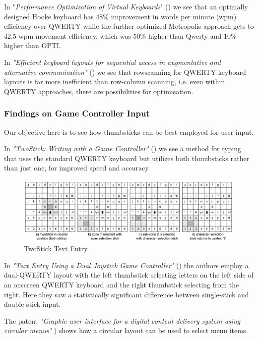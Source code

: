 \documentclass[
	letterpaper, %
]{jdf}
\begin{document}
In "\textit{Performance Optimization of Virtual Keyboards}" (\cite{zhai_hunter_smith_2002}) we see that an optimally designed Hooke keyboard has 48\% improvement in words per minute (wpm) efficiency over QWERTY while the further optimized Metropolis approach gets to 42.5 wpm movement efficiency, which was 50\% higher than Qwerty and 10\% higher than OPTI.

In \textit{"Efficient keyboard layouts for sequential access in augmentative and alternative communication"} (\cite{venkatagiri_1999}) we see that rowscanning for QWERTY keyboard layouts is far more inefficient than row-column scanning, i.e. even within QWERTY approaches, there are possibilities for optimisation.

\subsubsection{Findings on Game Controller Input}
Our objective here is to see how thumbsticks can be best employed for user input.

In \textit{"TwoStick: Writing with a Game Controller"} (\cite{twostick_2007}) we see a method for typing that uses the standard QWERTY keyboard but utilizes both thumbsticks rather than just one, for improved speed and accuracy.

\begin{figure}[h]
	\centering
	\includegraphics[width=14cm]{jdf-master/Figures/twostick.png}
	\caption{TwoStick Text Entry}
	\label{fig:twostick}
\end{figure}

In \textit{"Text Entry Using a Dual Joystick Game Controller"} (\cite{wilson_agrawala_2006}) the authors employ a dual-QWERTY layout with the left thumbstick selecting letters on the left side of an onscreen QWERTY keyboard and the right thumbstick selecting from the right. Here they saw a statistically significant difference between single-stick and double-stick input.

The patent \textit{"Graphic user interface for a digital content delivery system using circular menus"} \cite{eatsy_taplin_chechik_nelson_2002}) shows how a circular layout can be used to select menu items. 
\end{document}
